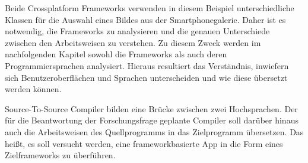 



Beide Crossplatform Frameworks verwenden in diesem Beispiel unterschiedliche Klassen für die Auswahl eines Bildes aus der Smartphonegalerie.  Daher ist es notwendig,  die Frameworks zu analysieren und die genauen Unterschiede zwischen den Arbeitsweisen zu verstehen.  Zu diesem Zweck werden im nachfolgenden Kapitel sowohl die Frameworks als auch deren Programmiersprachen analysiert.  Hieraus resultiert das Verständnis, inwiefern sich Benutzeroberflächen und Sprachen unterscheiden und wie diese übersetzt werden können.

Source-To-Source Compiler bilden eine Brücke zwischen zwei Hochsprachen.  Der für die Beantwortung der Forschungsfrage geplante Compiler soll darüber hinaus auch die Arbeitsweisen des Quellprogramms in das Zielprogramm übersetzen.  Das heißt, es soll versucht werden,  eine frameworkbasierte App in die Form eines Zielframeworks zu überführen. 




